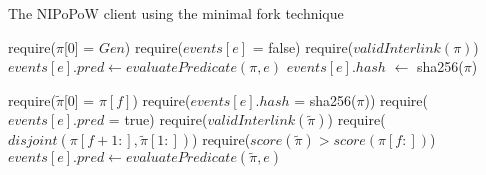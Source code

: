 \begin{algorithm}
    \label{alg:minimal-fork}
    \caption{The \textsf{NIPoPoW} client using the minimal fork technique}

    \begin{algorithmic}[1]
        \State require($\pi$[0] = $Gen$)
        \State require($events[e]$ = false)
        \State require($validInterlink(\pi)$)
        \State $events[e].pred \gets evaluatePredicate(\pi, e)$
        \State $events[e].hash$ $\gets$ sha256($\pi$)
    \EndFunction
    \vskip8pt
    \end{algorithmic}

    \begin{algorithmic}[1]
        \State require($\tilde\pi$[0] = $\pi[f]$)
        \State require($events[e].hash$ = sha256($\pi$))
        \State require($events[e].pred$ = true)
        \State require($validInterlink(\tilde\pi)$)
        \State require($disjoint(\pi[f+1:], \tilde\pi[1:])$)
        \State require($score(\tilde\pi) > score(\pi[f:])$)
        \State $events[e].pred \gets evaluatePredicate(\tilde\pi, e)$
    \EndFunction
    \vskip8pt
    \end{algorithmic}
\end{algorithm}

